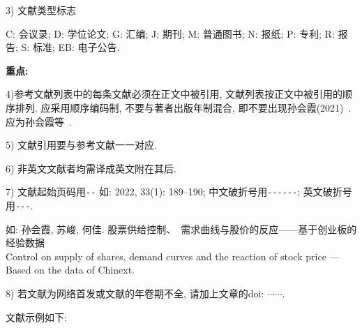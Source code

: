 \documentclass{setp-new}
\begin{document}
3) 文献类型标志

C: 会议录; D: 学位论文; G: 汇编; J: 期刊; M: 普通图书; N: 报纸; P: 专利; R: 报告; S: 标准; EB: 电子公告.


{\bf 重点:}

4)参考文献列表中的每条文献必须在正文中被引用, 文献列表按正文中被引用的顺序排列. 应采用顺序编码制, 不要与著者出版年制混合, 即不要出现孙会霞(2021)~\cite{ref1}.应为孙会霞等~\cite{ref1}.

5) 文献引用要与参考文献一一对应.

6) 非英文文献者均需译成英文附在其后.

7)  文献起始页码用\verb|--| 如: 2022, 33(1): 189--190;
中文破折号用\verb|------|; 英文破折号用\verb|---|.

如: 孙会霞, 苏峻, 何佳. 股票供给控制、~需求曲线与股价的反应------基于创业板的经验数据\\
 Control on supply of shares, demand curves and the reaction of stock price --- Based on the data of Chinext.

8) 若文献为网络首发或文献的年卷期不全, 请加上文章的doi: $\cdots$$\cdots$.

文献示例如下:
\end{document}
